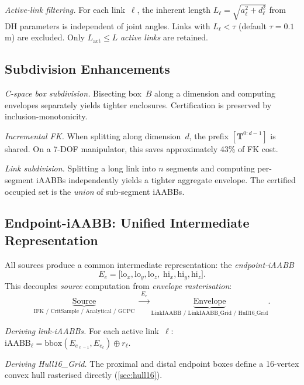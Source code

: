 \documentclass[journal]{IEEEtran}
\newcommand{\iAABB}{\text{iAABB}}
\newcommand{\bT}{\mathbf{T}}
\begin{document}
\emph{Active-link filtering.}
For each link~$\ell$, the inherent length
$L_\ell = \sqrt{a_\ell^2 + d_\ell^2}$ from DH parameters is
independent of joint angles.
Links with $L_\ell < \tau$ (default $\tau = 0.1\,$m) are excluded.
Only $L_\text{act} \leq L$ \emph{active links} are retained.

\subsection{Subdivision Enhancements}\label{sec:subdivision}

\emph{C-space box subdivision.}
Bisecting box~$B$ along a dimension and computing envelopes
separately yields tighter enclosures.
Certification is preserved by inclusion-monotonicity.

\emph{Incremental FK.}
When splitting along dimension~$d$, the prefix $[\bT^{0:d-1}]$ is
shared.
On a 7-DOF manipulator, this saves approximately 43\% of FK cost.

\emph{Link subdivision.}
Splitting a long link into $n$ segments and computing per-segment
iAABBs independently yields a tighter aggregate envelope.
The certified occupied set is the \emph{union} of sub-segment iAABBs.

\subsection{Endpoint-iAABB: Unified Intermediate Representation}%
\label{sec:endpoint_iaabb}

All sources produce a common intermediate representation: the
\emph{endpoint-iAABB}
\begin{equation}\label{eq:ep_iaabb}
  E_{e} = \bigl[\mathrm{lo}_x, \mathrm{lo}_y, \mathrm{lo}_z,\;
                 \mathrm{hi}_x, \mathrm{hi}_y, \mathrm{hi}_z\bigr].
\end{equation}
This decouples \emph{source} computation from
\emph{envelope rasterisation}:
\begin{equation}\label{eq:pipeline}
  \underbrace{\text{Source}}_{\text{IFK / CritSample / Analytical / GCPC}}
  \;\xrightarrow{\;E_e\;}
  \underbrace{\text{Envelope}}_{\text{LinkIAABB / LinkIAABB\_Grid / Hull16\_Grid}}.
\end{equation}

\emph{Deriving link-iAABBs.}
For each active link~$\ell$: $\iAABB_\ell = \mathrm{bbox}(E_{e_{\ell-1}},
E_{e_\ell}) \oplus r_\ell$.

\emph{Deriving Hull16\_Grid.}
The proximal and distal endpoint boxes define a 16-vertex convex hull
rasterised directly (\cref{sec:hull16}).
\end{document}
